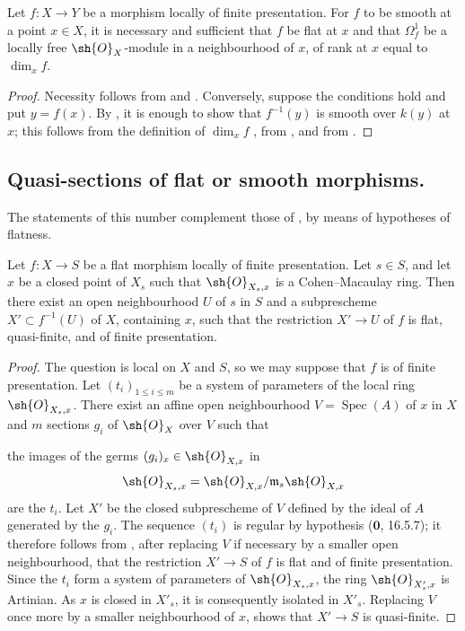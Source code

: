 \begin{proposition}[17.15.15]
\label{IV.17.15.15}
Let $f:X\to Y$ be a morphism locally of finite presentation.
For $f$ to be smooth at a point $x\in X$, it is necessary and sufficient that $f$ be flat at $x$ and that $\Omega^1_f$ be a locally free $\sh{O}_X$-module in a neighbourhood of $x$, of rank at $x$ equal to $\dim_x f$.
\end{proposition}

\begin{proof}
Necessity follows from  and .  Conversely, suppose the conditions hold and put $y=f(x)$.  By , it is enough to show that $f^{-1}(y)$ is smooth over $k(y)$ at $x$; this follows from the definition of $\dim_x f$ , from , and from .
\end{proof}


\subsection{Quasi-sections of flat or smooth morphisms.}
\label{subsection:IV.17.16}
\label{IV.17.16}

The statements of this number complement those of , by means of hypotheses of flatness.

\begin{proposition}[17.16.1]
\label{IV.17.16.1}
Let $f:X\to S$ be a flat morphism locally of finite presentation.  Let $s\in S$, and let $x$ be a closed point of $X_s$ such that $\sh{O}_{X_s,x}$ is a Cohen--Macaulay ring.  Then there exist an open neighbourhood $U$ of $s$ in $S$ and a subprescheme $X'\subset f^{-1}(U)$ of $X$, containing $x$, such that the restriction $X'\to U$ of $f$ is flat, quasi-finite, and of finite presentation.
\end{proposition}

\begin{proof}
The question is local on $X$ and $S$, so we may suppose that $f$ is of finite presentation.  Let $(t_i)_{1\leq i\leq m}$ be a system of parameters of the local ring $\sh{O}_{X_s,x}$.  There exist an affine open neighbourhood $V=\operatorname{Spec}(A)$ of $x$ in $X$ and $m$ sections $g_i$ of $\sh{O}_X$ over $V$ such that

the images of the germs $(g_i)_x\in\sh{O}_{X,x}$ in
\[
 \sh{O}_{X_s,x}=\sh{O}_{X,x}/\mathfrak m_s\sh{O}_{X,x}
\]
are the $t_i$.  Let $X'$ be the closed subprescheme of $V$ defined by the ideal of $A$ generated by the $g_i$.  The sequence $(t_i)$ is regular by hypothesis ($\mathbf{0}$, 16.5.7); it therefore follows from , after replacing $V$ if necessary by a smaller open neighbourhood, that the restriction $X'\to S$ of $f$ is flat and of finite presentation.  Since the $t_i$ form a system of parameters of $\sh{O}_{X_s,x}$, the ring $\sh{O}_{X'_s,x}$ is Artinian.  As $x$ is closed in $X'_s$, it is consequently isolated in $X'_s$.  Replacing $V$ once more by a smaller neighbourhood of $x$,  shows that $X'\to S$ is quasi-finite.
\end{proof}

